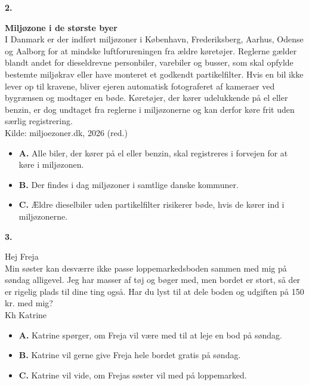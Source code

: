 \vspace{0.25em}
\textbf{\color{NCDRed}2.}
\begin{tcolorbox}[enhanced, breakable, frame hidden, colback=white, borderline={0.85pt}{0pt}{NCDGold, dashed}, arc=2pt, left=9pt, right=9pt, top=6pt, bottom=6pt]
\textbf{Miljøzone i de største byer}\\
I Danmark er der indført miljøzoner i København, Frederiksberg, Aarhus, Odense og Aalborg for at mindske luftforureningen fra ældre køretøjer. Reglerne gælder blandt andet for dieseldrevne personbiler, varebiler og busser, som skal opfylde bestemte miljøkrav eller have monteret et godkendt partikelfilter. Hvis en bil ikke lever op til kravene, bliver ejeren automatisk fotograferet af kameraer ved bygrænsen og modtager en bøde. Køretøjer, der kører udelukkende på el eller benzin, er dog undtaget fra reglerne i miljøzonerne og kan derfor køre frit uden særlig registrering.\\[2pt]
\null\hfill {\small\color{NCDGray}Kilde: miljoezoner.dk, 2026 (red.)}
\end{tcolorbox}
\begin{itemize}[leftmargin=1.8em, itemsep=0.12em]
  \item[{\small\fbox{\phantom{\textsf{x}}}}] \textbf{A.} Alle biler, der kører på el eller benzin, skal registreres i forvejen for at køre i miljøzonen.
  \item[{\small\fbox{\phantom{\textsf{x}}}}] \textbf{B.} Der findes i dag miljøzoner i samtlige danske kommuner.
  \item[{\small\fbox{\phantom{\textsf{x}}}}] \textbf{C.} Ældre dieselbiler uden partikelfilter risikerer bøde, hvis de kører ind i miljøzonerne.
\end{itemize}

\vspace{0.25em}
\textbf{\color{NCDRed}3.}
\begin{tcolorbox}[enhanced, breakable, colback=NCDBgGray, colframe=NCDTeal, boxrule=0.8pt, arc=8pt, left=10pt, right=10pt, top=6pt, bottom=6pt]
Hej Freja\\
Min søster kan desværre ikke passe loppemarkedsboden sammen med mig på søndag alligevel. Jeg har masser af tøj og bøger med, men bordet er stort, så der er rigelig plads til dine ting også. Har du lyst til at dele boden og udgiften på 150 kr. med mig?\\
Kh Katrine
\end{tcolorbox}
\begin{itemize}[leftmargin=1.8em, itemsep=0.12em]
  \item[{\small\fbox{\phantom{\textsf{x}}}}] \textbf{A.} Katrine spørger, om Freja vil være med til at leje en bod på søndag.
  \item[{\small\fbox{\phantom{\textsf{x}}}}] \textbf{B.} Katrine vil gerne give Freja hele bordet gratis på søndag.
  \item[{\small\fbox{\phantom{\textsf{x}}}}] \textbf{C.} Katrine vil vide, om Frejas søster vil med på loppemarked.
\end{itemize}

